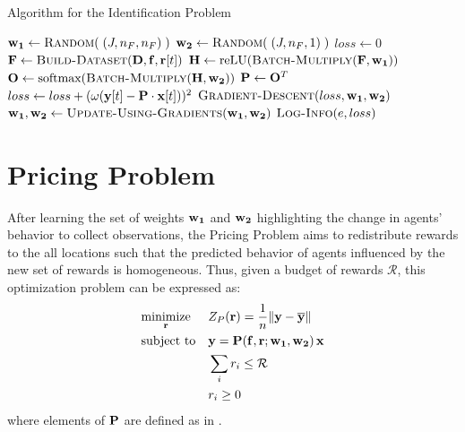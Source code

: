 \begin{algorithm}
    \caption{Algorithm for the Identification Problem} \label{alg:Algorithm for the Identification Problem}
    \begin{algorithmic}[1]
        \State $\matr{w_1} \gets \Call{Random}{\;(J,n_F,n_F)\;}$
        \State $\matr{w_2} \gets \Call{Random}{\;(J,n_F,1)\;}$
            \State $loss \gets 0$
                \State $\matr{F} \gets \Call{Build-Dataset}{\matr{D}, \matr{f}, \matr{r}[t]}$
                \State $\matr{H} \gets  \text{reLU}(\Call{Batch-Multiply}{\matr{F}, \matr{w_1}})$
                \State $\matr{O} \gets \text{softmax}(\Call{Batch-Multiply}{\matr{H}, \matr{w_2}})$
                \State $\mathbf{P} \gets \mathbf{O}^T$
                \State $loss \gets loss + (\omega(\mathbf{y}[t] - \mathbf{P} \cdot \mathbf{x}[t]))^2$
            \EndFor
            \State $\Call{Gradient-Descent}{loss, \matr{w_1}, \matr{w_2}}$
            \State $\matr{w_1}, \matr{w_2} \gets \Call{Update-Using-Gradients}{\matr{w_1}, \matr{w_2}}$
            \State $\Call{Log-Info}{e, loss}$
        \EndFor
    \end{algorithmic}
\end{algorithm}

\section{Pricing Problem} \label{sec:Pricing Problem}
After learning the set of weights $\mathbf{w_1}$ and $\mathbf{w_2}$ highlighting the change in agents' behavior to collect observations, the Pricing Problem aims to redistribute rewards to the all locations such that the predicted behavior of agents influenced by the new set of rewards is homogeneous. Thus, given a budget of rewards $\mathcal{R}$, this optimization problem can be expressed as:
\begin{equation} \label{eqn:pricing_problem}
    \begin{aligned}
        & \underset{\mathbf{r}}{\text{minimize}}
        & & Z_P(\mathbf{r}) = \frac{1}{n}\lVert \mathbf{y} - \overline{\mathbf{y}} \rVert\\
        & \text{subject to}
        & & \mathbf{y} = \mathbf{P}(\mathbf{f}, \mathbf{r}; \mathbf{w_1}, \mathbf{w_2}) \, \mathbf{x}\\
        &&& \sum_{i} r_i \leq \mathcal{R}\\
        &&& r_i \geq 0
    \end{aligned}
\end{equation}
where elements of $\mathbf{P}$ are defined as in .

